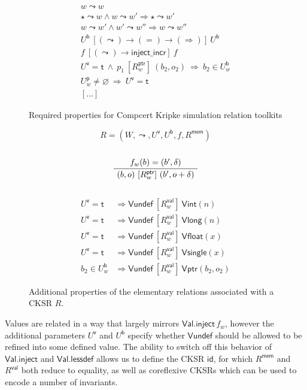 \documentclass[sigplan,10pt,review,anonymous]{acmart}
\newcommand{\kw}[1]{\ensuremath{ \textsf{#1} }}
\newcommand{\ifr}[1]{\ [{#1}]\ }
\begin{document}
\begin{figure} %
  \begin{gather*}
    w \leadsto w \\
    \star \leadsto w \wedge w \leadsto w' \Rightarrow \star \leadsto w' \\
    w \leadsto w' \wedge w' \leadsto w'' \Rightarrow w \leadsto w'' \\
    U^\kw{b} \ifr{(\leadsto) \rightarrow (=) \rightarrow (\Rightarrow)} U^\kw{b} \\
    f \ifr{(\leadsto) \rightarrow \kw{inject\_incr}} f \\
    U^\kw{v} = \kw{t} \ \wedge\  p_1 \ifr{R^\kw{ptr}_w} (b_2, o_2) \ \Rightarrow\  b_2 \in U^\kw{b}_w \\
    U^\kw{p}_w \neq \varnothing \ \Rightarrow\  U^\kw{v} = \kw{t} \\
    [\ldots]
  \end{gather*}
  \caption{Required properties for Compcert Kripke simulation relation toolkits}
  \label{fig:simrelprop}
\end{figure}

\begin{figure} %
  \small
  \[ R = (W, \leadsto, U^\kw{v}, U^\kw{b}, f, R^\kw{mem}) \]
  \noindent \fbox{$R_w^\kw{ptr}$} \hfill \ 
  \[
    \AxiomC{$f_w(b) = (b', \delta)$}
    \UnaryInfC{$(b, o) \ifr{R_w^\kw{ptr}} (b', o + \delta)$}
    \DisplayProof
  \]
  \noindent \fbox{$R_w^\kw{val}$} \hfill \ 
  \begin{align*}
    U^\kw{v} = \kw{t} &\Rightarrow
        \kw{Vundef} \ifr{R_w^\kw{val}} \kw{Vint}(n)
        \\
    U^\kw{v} = \kw{t} &\Rightarrow
        \kw{Vundef} \ifr{R_w^\kw{val}} \kw{Vlong}(n)
        \\
    U^\kw{v} = \kw{t} &\Rightarrow
        \kw{Vundef} \ifr{R_w^\kw{val}} \kw{Vfloat}(x)
        \\
    U^\kw{v} = \kw{t} &\Rightarrow
        \kw{Vundef} \ifr{R_w^\kw{val}} \kw{Vsingle}(x)
        \\
    b_2 \in U^\kw{b}_w &\Rightarrow
        \kw{Vundef} \ifr{R_w^\kw{val}} \kw{Vptr}(b_2, o_2)
  \end{align*}
  \caption{Additional properties of the elementary relations associated with a CKSR $R$.}
  \label{fig:simrel}
\end{figure}

Values are related in a way that largely mirrors $\kw{Val.inject}\,f_w$,
however the additional parameters $U^\kw{v}$ and $U^\kw{b}$
specify whether $\kw{Vundef}$ should be allowed to be refined
into some defined value.
The ability to switch off this behavior of \kw{Val.inject} and \kw{Val.lessdef}
allows us to define the CKSR \kw{id},
for which $R^\kw{mem}$ and $R^\kw{val}$ both reduce to equality,
as well as coreflexive CKSRs
which can be used to encode a number of invariants.
\end{document}
